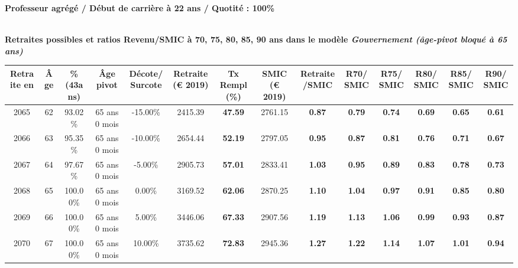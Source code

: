 {\bf \noindent Professeur agrégé / Début de carrière à 22 ans / Quotité : 100\%}  ~ 

 ~\\{\bf \noindent Retraites possibles et ratios Revenu/SMIC à 70, 75, 80, 85, 90 ans dans le modèle \emph{Gouvernement (âge-pivot bloqué à 65 ans)}}  
 
\begin{adjustbox}{max width=\textwidth} 
\begin{tabular}[htb]{|c|c||c|c|c||c|c||c|c||c|c|c|c|c|} 
\hline 
 Retraite en &  Âge &  \%(43ans) &  Âge pivot &  Décote/Surcote &  Retraite (\euro{} 2019) &  Tx Rempl(\%) &  SMIC (\euro{} 2019) &  Retraite/SMIC &  R70/SMIC &  R75/SMIC &  R80/SMIC &  R85/SMIC &  R90/SMIC \\ 
\hline \hline 
 2065 &  62 &  93.02\% &  65 ans 0 mois &  -15.00\% &  2415.39 &  {\bf 47.59} &  2761.15 &  {\bf {\color{red} 0.87}} &  {\bf {\color{red} 0.79}} &  {\bf {\color{red} 0.74}} &  {\bf {\color{red} 0.69}} &  {\bf {\color{red} 0.65}} &  {\bf {\color{red} 0.61}} \\ 
\hline 
 2066 &  63 &  95.35\% &  65 ans 0 mois &  -10.00\% &  2654.44 &  {\bf 52.19} &  2797.05 &  {\bf {\color{red} 0.95}} &  {\bf {\color{red} 0.87}} &  {\bf {\color{red} 0.81}} &  {\bf {\color{red} 0.76}} &  {\bf {\color{red} 0.71}} &  {\bf {\color{red} 0.67}} \\ 
\hline 
 2067 &  64 &  97.67\% &  65 ans 0 mois &  -5.00\% &  2905.73 &  {\bf 57.01} &  2833.41 &  {\bf 1.03} &  {\bf {\color{red} 0.95}} &  {\bf {\color{red} 0.89}} &  {\bf {\color{red} 0.83}} &  {\bf {\color{red} 0.78}} &  {\bf {\color{red} 0.73}} \\ 
\hline 
 2068 &  65 &  100.00\% &  65 ans 0 mois &  0.00\% &  3169.52 &  {\bf 62.06} &  2870.25 &  {\bf 1.10} &  {\bf 1.04} &  {\bf {\color{red} 0.97}} &  {\bf {\color{red} 0.91}} &  {\bf {\color{red} 0.85}} &  {\bf {\color{red} 0.80}} \\ 
\hline 
 2069 &  66 &  100.00\% &  65 ans 0 mois &  5.00\% &  3446.06 &  {\bf 67.33} &  2907.56 &  {\bf 1.19} &  {\bf 1.13} &  {\bf 1.06} &  {\bf {\color{red} 0.99}} &  {\bf {\color{red} 0.93}} &  {\bf {\color{red} 0.87}} \\ 
\hline 
 2070 &  67 &  100.00\% &  65 ans 0 mois &  10.00\% &  3735.62 &  {\bf 72.83} &  2945.36 &  {\bf 1.27} &  {\bf 1.22} &  {\bf 1.14} &  {\bf 1.07} &  {\bf 1.01} &  {\bf {\color{red} 0.94}} \\ 
\hline 
\hline 
\end{tabular} 
\end{adjustbox} 
 
